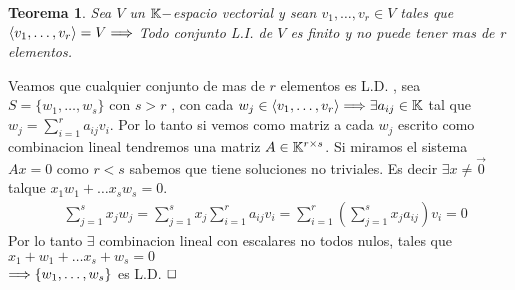 \documentclass[]{article}
\newtheorem{theorem}{Teorema}
\newenvironment{proof}{\noindent{\bf Prueba:}}{$\hfill \Box$ \vspace{10pt}}
\begin{document}
\begin{theorem}
    Sea $V$ un $\mathbb{K}-$espacio vectorial y sean $v_1,\dots ,v_r \in V$ tales que $\langle v_1,\dots ,v_r \rangle = V \Longrightarrow$
    Todo conjunto L.I. de $V$ es finito y no puede tener mas de r elementos.
\end{theorem}
\begin{proof}
    Veamos que cualquier conjunto de mas de $r$ elementos es L.D. , sea $S=\{w_1, \dots ,w_s\} $ con $s>r$ , con cada
    $w_j \in \langle v_1,\dots ,v_r \rangle \Longrightarrow \exists a_{ij} \in \mathbb{K}$ tal que $w_j = \sum_{i=1}^{r} a_{ij}v_i$.
    Por lo tanto si vemos como matriz a cada $w_j$ escrito como combinacion lineal tendremos una matriz $A \in \mathbb{K}^{r \times s}$.
    Si miramos el sistema $Ax=0$ como $r<s$ sabemos que tiene soluciones no triviales.
    Es decir $\exists x \neq \vec{0}$ talque $x_1w_1+ \dots x_sw_s = 0$.
    \begin{align*}
        &\sum_{j=1}^{s} x_j w_j = \sum_{j=1}^{s} x_j \sum_{i=1}^{r} a_{ij} v_i = \sum_{i=1}^{r} (\sum_{j=1}^{s} x_j a_{ij}) v_i =0
    \end{align*}
    Por lo tanto $\exists$ combinacion lineal con escalares no todos nulos, tales que $x_1+w_1 + \dots x_s+w_s=0$\\
    $\Longrightarrow \{w_1,\dots ,w_s\}$ es L.D.
\end{proof}
\end{document}
